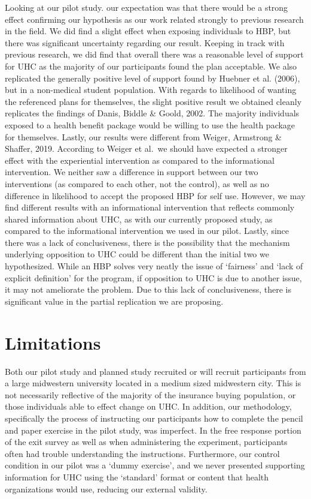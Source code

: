 \documentclass[
]{article}
\begin{document}
Looking at our pilot study. our expectation was that there would be a
strong effect confirming our hypothesis as our work related strongly to
previous research in the field. We did find a slight effect when
exposing individuals to HBP, but there was significant uncertainty
regarding our result. Keeping in track with previous research, we did
find that overall there was a reasonable level of support for UHC as the
majority of our participants found the plan acceptable. We also
replicated the generally positive level of support found by Huebner et
al. (2006), but in a non-medical student population. With regards to
likelihood of wanting the referenced plans for themselves, the slight
positive result we obtained cleanly replicates the findings of Danis,
Biddle \& Goold, 2002. The majority individuals exposed to a health
benefit package would be willing to use the health package for
themselves. Lastly, our results were different from Weiger, Armstrong \&
Shaffer, 2019. According to Weiger et al.~we should have expected a
stronger effect with the experiential intervention as compared to the
informational intervention. We neither saw a difference in support
between our two interventions (as compared to each other, not the
control), as well as no difference in likelihood to accept the proposed
HBP for self use. However, we may find different results with an
informational intervention that reflects commonly shared information
about UHC, as with our currently proposed study, as compared to the
informational intervention we used in our pilot. Lastly, since there was
a lack of conclusiveness, there is the possibility that the mechanism
underlying opposition to UHC could be different than the initial two we
hypothesized. While an HBP solves very neatly the issue of `fairness'
and `lack of explicit definition' for the program, if opposition to UHC
is due to another issue, it may not ameliorate the problem. Due to this
lack of conclusiveness, there is significant value in the partial
replication we are proposing.

\hypertarget{limitations}{%
\section{Limitations}\label{limitations}}

Both our pilot study and planned study recruited or will recruit
participants from a large midwestern university located in a medium
sized midwestern city. This is not necessarily reflective of the
majority of the insurance buying population, or those individuals able
to effect change on UHC. In addition, our methodology, specifically the
process of instructing our participants how to complete the pencil and
paper exercise in the pilot study, was imperfect. In the free response
portion of the exit survey as well as when administering the experiment,
participants often had trouble understanding the instructions.
Furthermore, our control condition in our pilot was a `dummy exercise',
and we never presented supporting information for UHC using the
`standard' format or content that health organizations would use,
reducing our external validity.
\end{document}
